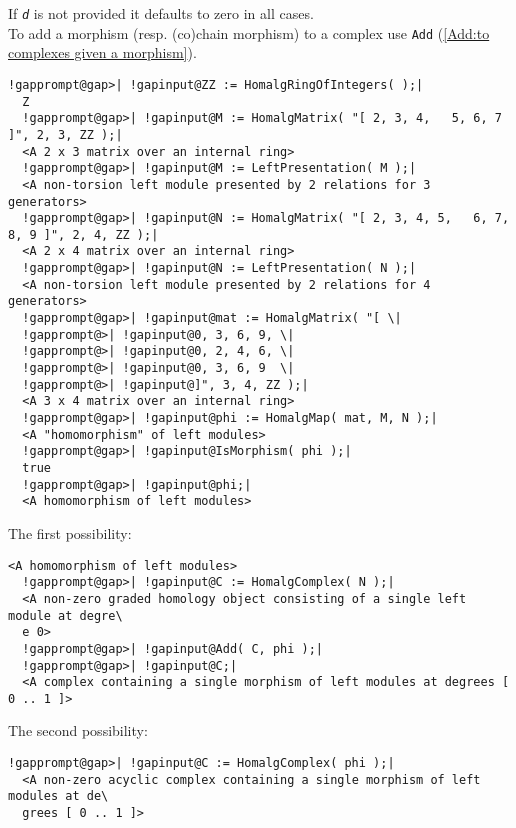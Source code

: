 \documentclass[a4paper,11pt]{report}
\begin{document}
{{{ If \mbox{\texttt{\mdseries\slshape d}} is not provided it defaults to zero in all cases. \\
 To add a morphism (resp. (co)chain morphism) to a complex use \texttt{Add} (\ref{Add:to complexes given a morphism}). 
\begin{Verbatim}[commandchars=!@|,fontsize=\small,frame=single,label=Example]
  !gapprompt@gap>| !gapinput@ZZ := HomalgRingOfIntegers( );|
  Z
  !gapprompt@gap>| !gapinput@M := HomalgMatrix( "[ 2, 3, 4,   5, 6, 7 ]", 2, 3, ZZ );|
  <A 2 x 3 matrix over an internal ring>
  !gapprompt@gap>| !gapinput@M := LeftPresentation( M );|
  <A non-torsion left module presented by 2 relations for 3 generators>
  !gapprompt@gap>| !gapinput@N := HomalgMatrix( "[ 2, 3, 4, 5,   6, 7, 8, 9 ]", 2, 4, ZZ );|
  <A 2 x 4 matrix over an internal ring>
  !gapprompt@gap>| !gapinput@N := LeftPresentation( N );|
  <A non-torsion left module presented by 2 relations for 4 generators>
  !gapprompt@gap>| !gapinput@mat := HomalgMatrix( "[ \|
  !gapprompt@>| !gapinput@0, 3, 6, 9, \|
  !gapprompt@>| !gapinput@0, 2, 4, 6, \|
  !gapprompt@>| !gapinput@0, 3, 6, 9  \|
  !gapprompt@>| !gapinput@]", 3, 4, ZZ );|
  <A 3 x 4 matrix over an internal ring>
  !gapprompt@gap>| !gapinput@phi := HomalgMap( mat, M, N );|
  <A "homomorphism" of left modules>
  !gapprompt@gap>| !gapinput@IsMorphism( phi );|
  true
  !gapprompt@gap>| !gapinput@phi;|
  <A homomorphism of left modules>
\end{Verbatim}
 The first possibility: 
\begin{Verbatim}[commandchars=!@|,fontsize=\small,frame=single,label=Example]
  <A homomorphism of left modules>
  !gapprompt@gap>| !gapinput@C := HomalgComplex( N );|
  <A non-zero graded homology object consisting of a single left module at degre\
  e 0>
  !gapprompt@gap>| !gapinput@Add( C, phi );|
  !gapprompt@gap>| !gapinput@C;|
  <A complex containing a single morphism of left modules at degrees [ 0 .. 1 ]>
\end{Verbatim}
 The second possibility: 
\begin{Verbatim}[commandchars=!@|,fontsize=\small,frame=single,label=Example]
  !gapprompt@gap>| !gapinput@C := HomalgComplex( phi );|
  <A non-zero acyclic complex containing a single morphism of left modules at de\
  grees [ 0 .. 1 ]>
\end{Verbatim}
 }

 

}}
\end{document}
